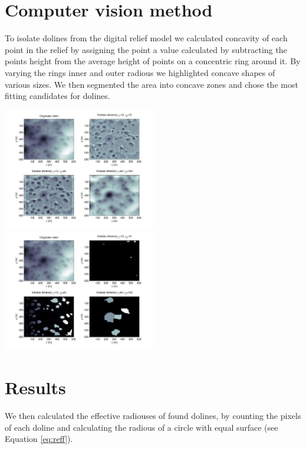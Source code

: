 \documentclass[a0,portrait]{a0poster}
\begin{document}
\begin{multicols}{2}
\section*{Computer vision method}

To isolate dolines from the digital relief model we calculated concavity of each point in the relief by assigning the point a value calculated by subtracting the points height from the average height of points on a concentric ring around it. By varying the rings inner and outer radious we highlighted concave shapes of various sizes.
We then segmented the area into concave zones and chose the most fitting candidates for dolines.

\begin{minipage}[b]{0.5\textwidth}
	\includegraphics[width=0.5\textwidth]{concavity-samples.pdf}
	\includegraphics[width=0.5\textwidth]{concavity-segmentation-samples.pdf}
\end{minipage}


\section*{Results}

We then calculated the effective radiouses of found dolines, by counting the pixels of each doline and calculating the radious of a circle with equal surface (see Equation \ref{eq:reff}).


\end{multicols}
\end{document}

